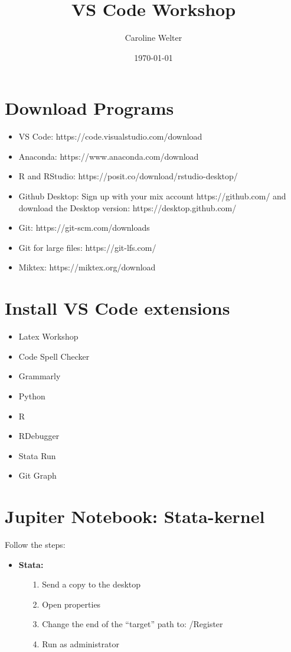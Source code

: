 \documentclass[12pt]{article}
\title{VS Code Workshop}
\author{Caroline Welter}
\date{\today}
\begin{document}
 
\maketitle
{}
\thispagestyle{empty}


\section{Download Programs}

\begin{itemize}
  \item VS Code: https://code.visualstudio.com/download
  \item Anaconda: https://www.anaconda.com/download 
  \item R and RStudio: https://posit.co/download/rstudio-desktop/
  \item Github Desktop: Sign up with your mix account https://github.com/ and download the Desktop version: https://desktop.github.com/
  \item Git: https://git-scm.com/downloads
  \item Git for large files: https://git-lfs.com/
  \item Miktex: https://miktex.org/download 
\end{itemize}

\section{Install VS Code extensions}
\begin{itemize}
  \item Latex Workshop
  \item Code Spell Checker
  \item Grammarly
  \item Python
  \item R
  \item RDebugger
  \item Stata Run
  \item Git Graph
\end{itemize}

\section{Jupiter Notebook: Stata-kernel}

Follow the steps:
\begin{itemize}
  \item \textbf{Stata:}
    \begin{itemize}
      \item[1.] Send a copy to the desktop
      \item[2.] Open properties 
      \item[3.] Change the end of the “target” path to:  /Register
      \item[4.] Run as administrator
    \end{itemize}
\end{itemize}
\end{document}
